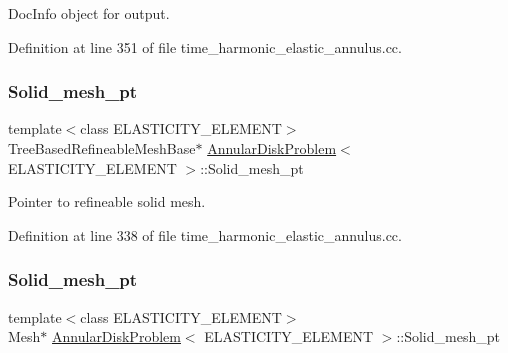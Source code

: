 Doc\+Info object for output. 



Definition at line 351 of file time\+\_\+harmonic\+\_\+elastic\+\_\+annulus.\+cc.

\mbox{\label{classAnnularDiskProblem_a7ef68977578d396e673a57bdf35f931c}} 
\subsubsection{\texorpdfstring{Solid\+\_\+mesh\+\_\+pt}{Solid\_mesh\_pt}\hspace{0.1cm}{\footnotesize\ttfamily [1/2]}}
{\footnotesize\ttfamily template$<$class E\+L\+A\+S\+T\+I\+C\+I\+T\+Y\+\_\+\+E\+L\+E\+M\+E\+NT$>$ \\
Tree\+Based\+Refineable\+Mesh\+Base$\ast$ \hyperlink{classAnnularDiskProblem}{Annular\+Disk\+Problem}$<$ E\+L\+A\+S\+T\+I\+C\+I\+T\+Y\+\_\+\+E\+L\+E\+M\+E\+NT $>$\+::Solid\+\_\+mesh\+\_\+pt\hspace{0.3cm}{\ttfamily [private]}}



Pointer to refineable solid mesh. 



Definition at line 338 of file time\+\_\+harmonic\+\_\+elastic\+\_\+annulus.\+cc.

\mbox{\label{classAnnularDiskProblem_a2cc0ee9d7a87cdd2857b1c34e9d14c00}} 
\subsubsection{\texorpdfstring{Solid\+\_\+mesh\+\_\+pt}{Solid\_mesh\_pt}\hspace{0.1cm}{\footnotesize\ttfamily [2/2]}}
{\footnotesize\ttfamily template$<$class E\+L\+A\+S\+T\+I\+C\+I\+T\+Y\+\_\+\+E\+L\+E\+M\+E\+NT$>$ \\
Mesh$\ast$ \hyperlink{classAnnularDiskProblem}{Annular\+Disk\+Problem}$<$ E\+L\+A\+S\+T\+I\+C\+I\+T\+Y\+\_\+\+E\+L\+E\+M\+E\+NT $>$\+::Solid\+\_\+mesh\+\_\+pt\hspace{0.3cm}{\ttfamily [private]}}



